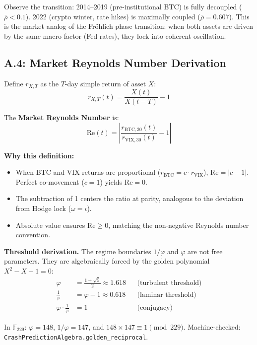 Observe the transition: 2014--2019 (pre-institutional BTC) is fully decoupled ($\bar\rho < 0.1$). 2022 (crypto winter, rate hikes) is maximally coupled ($\bar\rho = 0.607$). This is the market analog of the Fröhlich phase transition: when both assets are driven by the same macro factor (Fed rates), they lock into coherent oscillation.

\subsection*{A.4: Market Reynolds Number Derivation}

Define $r_{X,T}$ as the $T$-day simple return of asset $X$:
$$r_{X,T}(t) = \frac{X(t)}{X(t-T)} - 1$$

The \textbf{Market Reynolds Number} is:
\begin{equation}\label{eq:reynolds_def}
    \mathrm{Re}(t) = \left|\frac{r_{\text{BTC},30}(t)}{r_{\text{VIX},30}(t)} - 1\right|
\end{equation}

\textbf{Why this definition:}
\begin{itemize}[noitemsep]
\item When BTC and VIX returns are proportional ($r_{\text{BTC}} = c \cdot r_{\text{VIX}}$), $\mathrm{Re} = |c - 1|$. Perfect co-movement ($c = 1$) yields $\mathrm{Re} = 0$.
\item The subtraction of 1 centers the ratio at parity, analogous to the deviation from Hodge lock ($\omega = \iota$).
\item Absolute value ensures $\mathrm{Re} \geq 0$, matching the non-negative Reynolds number convention.
\end{itemize}

\textbf{Threshold derivation.} The regime boundaries $1/\varphi$ and $\varphi$ are not free parameters. They are algebraically forced by the golden polynomial $X^2 - X - 1 = 0$:
\begin{align}
\varphi &= \frac{1+\sqrt{5}}{2} \approx 1.618 & &\text{(turbulent threshold)} \\
\frac{1}{\varphi} &= \varphi - 1 \approx 0.618 & &\text{(laminar threshold)} \\
\varphi \cdot \frac{1}{\varphi} &= 1 & &\text{(conjugacy)}
\end{align}

In $\mathbb{F}_{229}$: $\varphi = 148$, $1/\varphi = 147$, and $148 \times 147 \equiv 1 \pmod{229}$. Machine-checked: \texttt{CrashPredictionAlgebra.golden\_reciprocal}.


